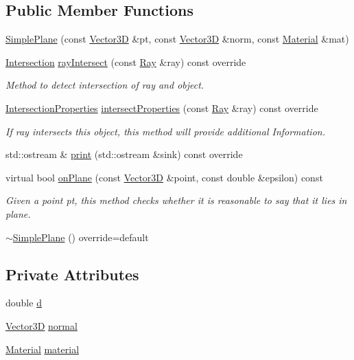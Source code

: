 \subsection*{Public Member Functions}
\begin{DoxyCompactItemize}
\item 
\hyperlink{classSimplePlane_a4536573a977f9d4c30334f9c4aab6a1d}{Simple\+Plane} (const \hyperlink{classVector3D}{Vector3D} \&pt, const \hyperlink{classVector3D}{Vector3D} \&norm, const \hyperlink{classMaterial}{Material} \&mat)
\item 
\hyperlink{classIntersection}{Intersection} \hyperlink{classSimplePlane_aef2f898a5a5a630a0e63cad969eb3101}{ray\+Intersect} (const \hyperlink{classRay}{Ray} \&ray) const override
\begin{DoxyCompactList}\small\item\em Method to detect intersection of ray and object. \end{DoxyCompactList}\item 
\hyperlink{classIntersectionProperties}{Intersection\+Properties} \hyperlink{classSimplePlane_a4dd699513026ac0d28586ac552fd1ed2}{intersect\+Properties} (const \hyperlink{classRay}{Ray} \&ray) const override
\begin{DoxyCompactList}\small\item\em If ray intersects this object, this method will provide additional Information. \end{DoxyCompactList}\item 
std\+::ostream \& \hyperlink{classSimplePlane_afc8014126bb264e11e7b2b470a8a90a1}{print} (std\+::ostream \&sink) const override
\item 
virtual bool \hyperlink{classSimplePlane_a74bbd8b10263fe1df821d8479f1ab5ef}{on\+Plane} (const \hyperlink{classVector3D}{Vector3D} \&point, const double \&epsilon) const 
\begin{DoxyCompactList}\small\item\em Given a point pt, this method checks whether it is reasonable to say that it lies in plane. \end{DoxyCompactList}\item 
\hyperlink{classSimplePlane_abc63c5079688f3d1826a7f2ed5f9db3f}{$\sim$\+Simple\+Plane} () override=default
\end{DoxyCompactItemize}
\subsection*{Private Attributes}
\begin{DoxyCompactItemize}
\item 
double \hyperlink{classSimplePlane_a84850a97b34a8616c7ffdd51c30a5dc9}{d}
\item 
\hyperlink{classVector3D}{Vector3D} \hyperlink{classSimplePlane_a222f5d12aed966bc2764abc90b622037}{normal}
\item 
\hyperlink{classMaterial}{Material} \hyperlink{classSimplePlane_a04307eae806daa2cd2f1c471224b44cf}{material}
\end{DoxyCompactItemize}


